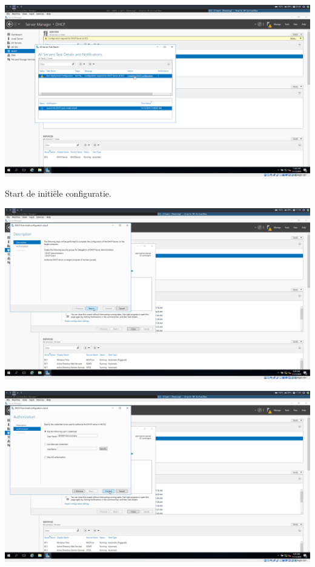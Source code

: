 \documentclass[a4paper]{article}
\begin{document}
\begin{center}
	\includegraphics[width=15cm]{Pictures/DC2/DHCP/1542308778.png}
	
	Start de initiële configuratie.
\end{center}
\begin{center}
	\includegraphics[width=15cm]{Pictures/DC2/DHCP/1542299964.png}
\end{center}
\begin{center}
	\includegraphics[width=15cm]{Pictures/DC2/DHCP/1542299973.png}
\end{center}
\end{document}
